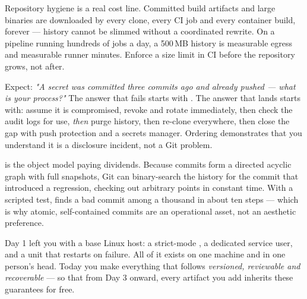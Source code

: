 \begin{costnote}
Repository hygiene is a real cost line. Committed build artifacts and large binaries are downloaded by every clone, every CI job and every container build, forever --- history cannot be slimmed without a coordinated rewrite. On a pipeline running hundreds of jobs a day, a 500\,MB history is measurable egress and measurable runner minutes. Enforce a size limit in CI before the repository grows, not after.
\end{costnote}

\begin{interview}
Expect: \emph{"A secret was committed three commits ago and already pushed --- what is your process?"} The answer that fails starts with . The answer that lands starts with: assume it is compromised, revoke and rotate immediately, then check the audit logs for use, \emph{then} purge history, then re-clone everywhere, then close the gap with push protection and a secrets manager. Ordering demonstrates that you understand it is a disclosure incident, not a Git problem.
\end{interview}

\begin{behind}
 is the object model paying dividends. Because commits form a directed acyclic graph with full snapshots, Git can binary-search the history for the commit that introduced a regression, checking out arbitrary points in constant time. With a scripted test,  finds a bad commit among a thousand in about ten steps --- which is why atomic, self-contained commits are an operational asset, not an aesthetic preference.
\end{behind}


Day 1 left you with a base Linux host: a strict-mode , a dedicated service user, and a  unit that restarts on failure. All of it exists on one machine and in one person's head. Today you make everything that follows \emph{versioned, reviewable and recoverable} --- so that from Day 3 onward, every artifact you add inherits these guarantees for free.

